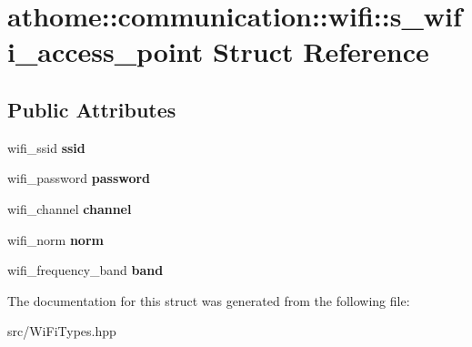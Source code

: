 \hypertarget{structathome_1_1communication_1_1wifi_1_1s__wifi__access__point}{}\section{athome\+:\+:communication\+:\+:wifi\+:\+:s\+\_\+wifi\+\_\+access\+\_\+point Struct Reference}
\label{structathome_1_1communication_1_1wifi_1_1s__wifi__access__point}
\subsection*{Public Attributes}
\begin{DoxyCompactItemize}
\item 
\mbox{\label{structathome_1_1communication_1_1wifi_1_1s__wifi__access__point_a215e9c0f8f72c926110bc7f46360e1ea}} 
wifi\+\_\+ssid {\bfseries ssid}
\item 
\mbox{\label{structathome_1_1communication_1_1wifi_1_1s__wifi__access__point_a13c710aba9ae52ad4360c667c914b988}} 
wifi\+\_\+password {\bfseries password}
\item 
\mbox{\label{structathome_1_1communication_1_1wifi_1_1s__wifi__access__point_accf0d6bf42e6d30be881bf9247200c73}} 
wifi\+\_\+channel {\bfseries channel}
\item 
\mbox{\label{structathome_1_1communication_1_1wifi_1_1s__wifi__access__point_acbae620a23b6d1a0dd073597f5e167bf}} 
wifi\+\_\+norm {\bfseries norm}
\item 
\mbox{\label{structathome_1_1communication_1_1wifi_1_1s__wifi__access__point_af738ada78d21e0c9d70b3d713bfd708c}} 
wifi\+\_\+frequency\+\_\+band {\bfseries band}
\end{DoxyCompactItemize}


The documentation for this struct was generated from the following file\+:\begin{DoxyCompactItemize}
\item 
src/Wi\+Fi\+Types.\+hpp\end{DoxyCompactItemize}
